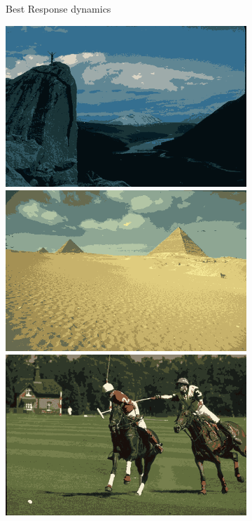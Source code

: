 \documentclass{beamer}
\begin{document}
\begin{frame}
\begin{figure}
\begin{subfigure}[b]{0.25\textwidth}
            \caption{Best Response dynamics}
        \end{subfigure}
        \hfill
        \begin{subfigure}[b]{0.25\textwidth}
            \centering
            \includegraphics[width=\textwidth]{../figures/methods/rd/14037_avg.png}
            \includegraphics[width=\textwidth]{../figures/methods/rd/260058_avg.png}
            \includegraphics[width=\textwidth]{../figures/methods/rd/361010_avg.png}

\end{subfigure}
\end{figure}
\end{frame}
\end{document}
